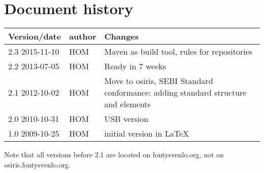 \section*{Document history}
\begin{tabular}{|p{20mm}|p{10mm}|p{110mm}|}\hline
\textbf{Version/date} & \textbf{author}& \textbf{Changes}\\\hline
2.3 2015-11-10& HOM & Maven as build tool, rules for repositories\\\hline
2.2 2013-07-05& HOM & Ready in 7 weeks\\\hline
2.1 2012-10-02& HOM & Move to osiris, SEBI Standard conformance:
                      adding standard 
                      structure and elements \\\hline

2.0 2010-10-31& HOM & USB version \\\hline
1.0 2009-10-25& HOM & initial version in \LaTeX\\\hline
\end{tabular}

Note that all versions before 2.1 are located on fontysvenlo.org, not
on osiris.fontysvenlo.org.

